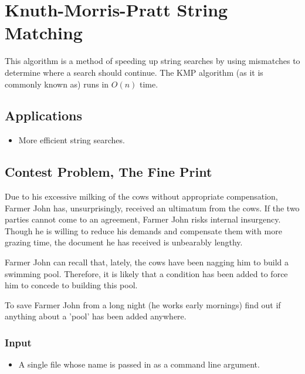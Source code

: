 \section{Knuth-Morris-Pratt String Matching}
This algorithm is a method of speeding up string searches by using mismatches to determine where a search should continue.
The KMP algorithm (as it is commonly known as) runs in $O(n)$ time.

\subsection{Applications}
\begin{itemize}
	\item More efficient string searches.
\end{itemize}

\subsection{Contest Problem, The Fine Print}
Due to his excessive milking of the cows without appropriate compensation, Farmer John has, unsurprisingly, received an ultimatum from the cows.
If the two parties cannot come to an agreement, Farmer John risks internal insurgency.
Though he is willing to reduce his demands and compensate them with more grazing time, the document he has received is unbearably lengthy.

Farmer John can recall that, lately, the cows have been nagging him to build a swimming pool.
Therefore, it is likely that a condition has been added to force him to concede to building this pool.

To save Farmer John from a long night (he works early mornings) find out if anything about a 'pool' has been added anywhere.

\subsubsection{Input}
\begin{itemize}
	\item A single file whose name is passed in as a command line argument.
\end{itemize}



